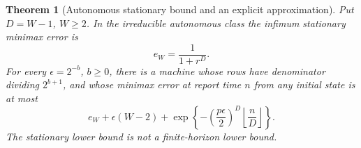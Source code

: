 \documentclass[11pt]{amsart}
\newtheorem{theorem}{Theorem}[section]
\theoremstyle{definition}\newtheorem{definition}[theorem]{Definition}
\theoremstyle{remark}\newtheorem{remark}[theorem]{Remark}
\newcommand{\1}{\mathbf 1}
\begin{document}
\begin{theorem}[Autonomous stationary bound and an explicit approximation]
\label{thm:autonomous}
Put $D=W-1$, $W\ge2$. In the irreducible autonomous class the infimum
stationary minimax error is
\begin{equation}\label{eq:HC}
                         e_W=\frac1{1+r^D}.
\end{equation}
For every $\epsilon=2^{-b}$, $b\ge0$, there is a machine whose rows have
denominator dividing $2^{b+1}$, and whose minimax error at report time $n$
from any initial state is at most
\begin{equation}\label{eq:aut-time}
 e_W+\epsilon(W-2)
       +\exp\left\{-\left(\frac{p\epsilon}{2}\right)^D
                            \left\lfloor\frac nD\right\rfloor\right\}.
\end{equation}
The stationary lower bound is not a finite-horizon lower bound.
\end{theorem}
\end{document}
